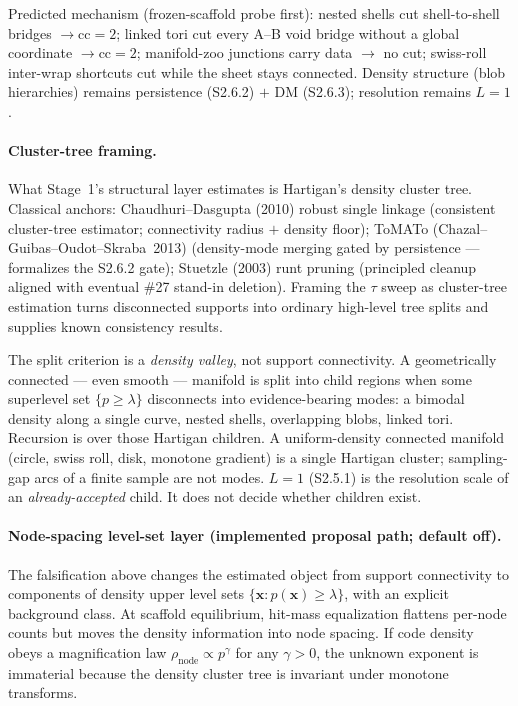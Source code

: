 \documentclass[11pt]{article}
\begin{document}
Predicted mechanism (frozen-scaffold probe first): nested shells cut
shell-to-shell bridges $\to\mathrm{cc}{=}2$; linked tori cut every A--B void
bridge without a global coordinate $\to\mathrm{cc}{=}2$; manifold-zoo junctions
carry data $\to$ no cut; swiss-roll inter-wrap shortcuts cut while the sheet
stays connected. Density structure (blob hierarchies) remains persistence
(S2.6.2) $+$ DM (S2.6.3); resolution remains $L{=}1$.

\paragraph{Cluster-tree framing.}
What Stage~1's structural layer estimates is Hartigan's density cluster tree.
Classical anchors: Chaudhuri--Dasgupta (2010) robust single linkage (consistent
cluster-tree estimator; connectivity radius $+$ density floor); ToMATo
(Chazal--Guibas--Oudot--Skraba~2013) (density-mode merging gated by persistence
--- formalizes the S2.6.2 gate); Stuetzle (2003) runt pruning (principled
cleanup aligned with eventual \#27 stand-in deletion). Framing the $\tau$ sweep
as cluster-tree estimation turns disconnected supports into ordinary high-level
tree splits and supplies known consistency results.

The split criterion is a \emph{density valley}, not support connectivity. A
geometrically connected --- even smooth --- manifold is split into child
regions when some superlevel set $\{p\ge\lambda\}$ disconnects into
evidence-bearing modes: a bimodal density along a single curve, nested
shells, overlapping blobs, linked tori. Recursion is over those Hartigan
children. A uniform-density connected manifold (circle, swiss roll, disk,
monotone gradient) is a single Hartigan cluster; sampling-gap arcs of a
finite sample are not modes. $L{=}1$ (S2.5.1) is the resolution scale of an
\emph{already-accepted} child. It does not decide whether children exist.

\paragraph{Node-spacing level-set layer (implemented proposal path;
default off).}
\label{sec:si-level-set}
The falsification above changes the estimated object from support connectivity
to components of density upper level sets
$\{\mathbf x:p(\mathbf x)\ge\lambda\}$, with an explicit background class.
At scaffold equilibrium, hit-mass equalization flattens per-node counts but
moves the density information into node spacing. If code density obeys a
magnification law $\rho_{\mathrm{node}}\propto p^\gamma$ for any
$\gamma>0$, the unknown exponent is immaterial because the density cluster
tree is invariant under monotone transforms.
\end{document}
